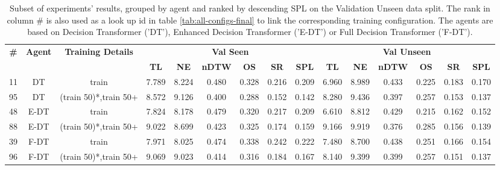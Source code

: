 \begin{table}
\centering
\caption{\label{tab:split_training_50}Subset of experiments' results, grouped by agent and ranked by descending SPL on the Validation Unseen data split. The rank in column \# is also used as a look up id in table \ref{tab:all-configs-final} to link the corresponding training configuration.     \newline The agents are based on Decision Transformer ('DT'), Enhanced Decision Transformer ('E-DT') or Full Decision Transformer ('F-DT').}
\begin{tabular}{@{\hskip3pt}c@{\hskip3pt}c@{\hskip3pt}c@{\hskip3pt}c@{\hskip3pt}c@{\hskip3pt}c@{\hskip3pt}c@{\hskip3pt}c@{\hskip3pt}c@{\hskip3pt}c@{\hskip3pt}c@{\hskip3pt}c@{\hskip3pt}c@{\hskip3pt}c@{\hskip3pt}c}
\toprule
\textbf{\#} & \textbf{Agent} & \textbf{Training Details} & \multicolumn{6}{c}{\textbf{Val Seen}} & \multicolumn{6}{c}{\textbf{Val Unseen}} \\
\cmidrule(l){4-9} \cmidrule(l){10-15} \textbf{~} &     \textbf{~} &                \textbf{~} &       \textbf{TL} & \textbf{NE} & \textbf{nDTW} & \textbf{OS} & \textbf{SR} & \textbf{SPL} &         \textbf{TL} & \textbf{NE} & \textbf{nDTW} & \textbf{OS} & \textbf{SR} & \textbf{SPL} \\
\midrule
         11 &             DT &                     train &             7.789 &       8.224 &         0.480 &       0.328 &       0.216 &        0.209 &               6.960 &       8.989 &         0.433 &       0.225 &       0.183 &        0.170 \\
         95 &             DT &     (train 50)*,train 50+ &             8.572 &       9.126 &         0.400 &       0.288 &       0.152 &        0.142 &               8.280 &       9.436 &         0.397 &       0.257 &       0.153 &        0.137 \\
         48 &           E-DT &                     train &             7.824 &       8.178 &         0.479 &       0.320 &       0.217 &        0.209 &               6.610 &       8.812 &         0.429 &       0.215 &       0.162 &        0.152 \\
         88 &           E-DT &     (train 50)*,train 50+ &             9.022 &       8.699 &         0.423 &       0.325 &       0.174 &        0.159 &               9.166 &       9.919 &         0.376 &       0.285 &       0.156 &        0.139 \\
         39 &           F-DT &                     train &             7.971 &       8.025 &         0.474 &       0.338 &       0.242 &        0.222 &               7.480 &       8.700 &         0.438 &       0.251 &       0.166 &        0.154 \\
         96 &           F-DT &     (train 50)*,train 50+ &             9.069 &       9.023 &         0.414 &       0.316 &       0.184 &        0.167 &               8.140 &       9.399 &         0.399 &       0.257 &       0.151 &        0.137 \\
\bottomrule
\end{tabular}
\end{table}
